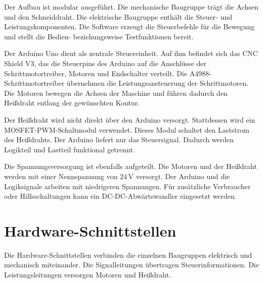 Der Aufbau ist modular ausgeführt. Die mechanische Baugruppe trägt die Achsen und den Schneiddraht. Die elektrische Baugruppe enthält die Steuer- und Leistungskomponenten. Die Software erzeugt die Steuerbefehle für die Bewegung und stellt die Bedien- beziehungsweise Testfunktionen bereit.

Der Arduino Uno dient als zentrale Steuereinheit. Auf ihm befindet sich das CNC Shield V3, das die Steuerpins des Arduino auf die Anschlüsse der Schrittmotortreiber, Motoren und Endschalter verteilt. Die A4988-Schrittmotortreiber übernehmen die Leistungsansteuerung der Schrittmotoren. Die Motoren bewegen die Achsen der Maschine und führen dadurch den Heißdraht entlang der gewünschten Kontur.

Der Heißdraht wird nicht direkt über den Arduino versorgt. Stattdessen wird ein MOSFET-PWM-Schaltmodul verwendet. Dieses Modul schaltet den Laststrom des Heißdrahts. Der Arduino liefert nur das Steuersignal. Dadurch werden Logikteil und Lastteil funktional getrennt.

Die Spannungsversorgung ist ebenfalls aufgeteilt. Die Motoren und der Heißdraht werden mit einer Nennspannung von \(24\,\mathrm{V}\) versorgt. Der Arduino und die Logiksignale arbeiten mit niedrigeren Spannungen. Für zusätzliche Verbraucher oder Hilfsschaltungen kann ein DC-DC-Abwärtswandler eingesetzt werden.

\section{Hardware-Schnittstellen}
\label{sec:komplettes_system_hardware_schnittstellen}

Die Hardware-Schnittstellen verbinden die einzelnen Baugruppen elektrisch und mechanisch miteinander. Die Signalleitungen übertragen Steuerinformationen. Die Leistungsleitungen versorgen Motoren und Heißdraht.

